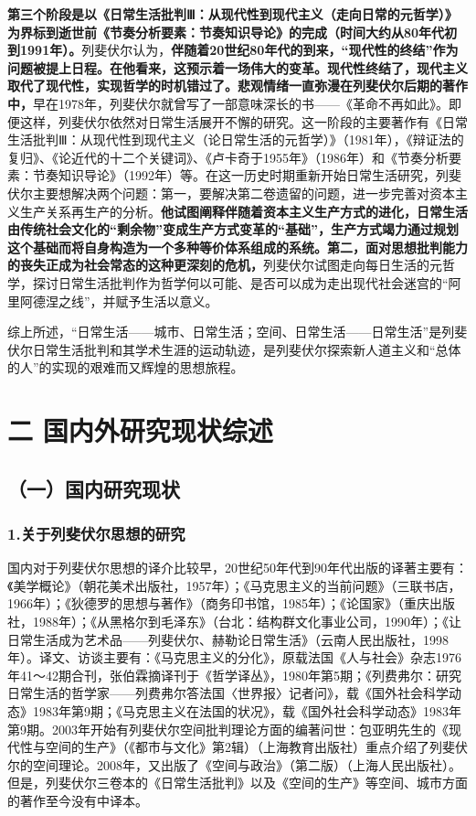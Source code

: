 \documentclass[UTF8, fontset = sourcesans, a4paper, oneside, zihao =
-4, scheme=chinese, no-math, space=true]{ctexbook}
\begin{document}
\textbf{第三个阶段是以《日常生活批判Ⅲ：从现代性到现代主义（走向日常的元哲学）》为界标到逝世前《节奏分析要素：节奏知识导论》的完成（时间大约从80年代初到1991年）。}列斐伏尔认为，\textbf{伴随着20世纪80年代的到来，``现代性的终结''作为问题被提上日程。在他看来，这预示着一场伟大的变革。现代性终结了，现代主义取代了现代性，实现哲学的时机错过了。悲观情绪一直弥漫在列斐伏尔后期的著作中，}早在1978年，列斐伏尔就曾写了一部意味深长的书------《革命不再如此》。即便这样，列斐伏尔依然对日常生活展开不懈的研究。这一阶段的主要著作有《日常生活批判Ⅲ：从现代性到现代主义（论日常生活的元哲学）》（1981年），《辩证法的复归》、《论近代的十二个关键词》、《卢卡奇于1955年》（1986年）和《节奏分析要素：节奏知识导论》（1992年）等。在这一历史时期重新开始日常生活研究，列斐伏尔主要想解决两个问题：第一，要解决第二卷遗留的问题，进一步完善对资本主义生产关系再生产的分析。\textbf{他试图阐释伴随着资本主义生产方式的进化，日常生活由传统社会文化的``剩余物''变成生产方式变革的``基础''，生产方式竭力通过规划这个基础而将自身构造为一个多种等价体系组成的系统。第二，面对思想批判能力的丧失正成为社会常态的这种更深刻的危机，}列斐伏尔试图走向每日生活的元哲学，探讨日常生活批判作为哲学何以可能、是否可以成为走出现代社会迷宫的``阿里阿德涅之线''，并赋予生活以意义。

综上所述，``日常生活------城市、日常生活；空间、日常生活------日常生活''是列斐伏尔日常生活批判和其学术生涯的运动轨迹，是列斐伏尔探索新人道主义和``总体的人''的实现的艰难而又辉煌的思想旅程。

\section{二 国内外研究现状综述}\label{part0004.htmlux5cux23c002}

\subsection{（一）国内研究现状}\label{part0004.htmlux5cux23d001}

\subsubsection{1.关于列斐伏尔思想的研究}\label{part0004.htmlux5cux23e001}

国内对于列斐伏尔思想的译介比较早，20世纪50年代到90年代出版的译著主要有：《美学概论》（朝花美术出版社，1957年）；《马克思主义的当前问题》（三联书店，1966年）；《狄德罗的思想与著作》（商务印书馆，1985年）；《论国家》（重庆出版社，1988年）；《从黑格尔到毛泽东》（台北：结构群文化事业公司，1990年）；《让日常生活成为艺术品------列斐伏尔、赫勒论日常生活》（云南人民出版社，1998年）。译文、访谈主要有：《马克思主义的分化》，原载法国《人与社会》杂志1976年41～42期合刊，张伯霖摘译刊于《哲学译丛》，1980年第5期；《列费弗尔：研究日常生活的哲学家------列费弗尔答法国〈世界报〉记者问》，载《国外社会科学动态》1983年第9期；《马克思主义在法国的状况》，载《国外社会科学动态》1983年第9期。2003年开始有列斐伏尔空间批判理论方面的编著问世：包亚明先生的《现代性与空间的生产》（《都市与文化》第2辑）（上海教育出版社）重点介绍了列斐伏尔的空间理论。2008年，又出版了《空间与政治》（第二版）（上海人民出版社）。但是，列斐伏尔三卷本的《日常生活批判》以及《空间的生产》等空间、城市方面的著作至今没有中译本。
\end{document}
